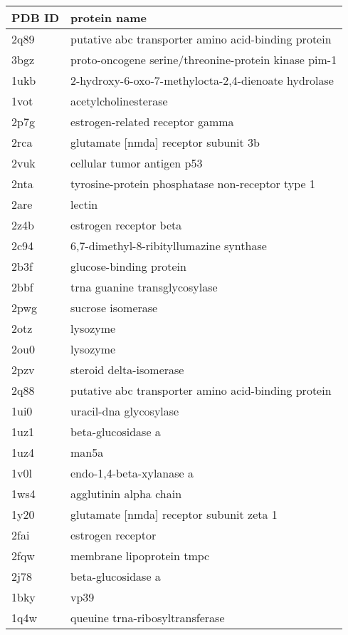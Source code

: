 \begin{tabular}{|l|l|}
\hline
\textbf{PDB ID} & \textbf{protein name} \\
\hline
\hline
2q89 & putative abc transporter amino acid-binding protein \\
\hline
3bgz & proto-oncogene serine/threonine-protein kinase pim-1 \\
\hline
1ukb & 2-hydroxy-6-oxo-7-methylocta-2,4-dienoate hydrolase \\
\hline
1vot & acetylcholinesterase \\
\hline
2p7g & estrogen-related receptor gamma \\
\hline
2rca & glutamate [nmda] receptor subunit 3b \\
\hline
2vuk & cellular tumor antigen p53 \\
\hline
2nta & tyrosine-protein phosphatase non-receptor type 1 \\
\hline
2are & lectin \\
\hline
2z4b & estrogen receptor beta \\
\hline
2c94 & 6,7-dimethyl-8-ribityllumazine synthase \\
\hline
2b3f & glucose-binding protein \\
\hline
2bbf & trna guanine transglycosylase \\
\hline
2pwg & sucrose isomerase \\
\hline
2otz & lysozyme \\
\hline
2ou0 & lysozyme \\
\hline
2pzv & steroid delta-isomerase \\
\hline
2q88 & putative abc transporter amino acid-binding protein \\
\hline
1ui0 & uracil-dna glycosylase \\
\hline
1uz1 & beta-glucosidase a \\
\hline
1uz4 & man5a \\
\hline
1v0l & endo-1,4-beta-xylanase a \\
\hline
1ws4 & agglutinin alpha chain \\
\hline
1y20 & glutamate [nmda] receptor subunit zeta 1 \\
\hline
2fai & estrogen receptor \\
\hline
2fqw & membrane lipoprotein tmpc \\
\hline
2j78 & beta-glucosidase a \\
\hline
1bky & vp39 \\
\hline
1q4w & queuine trna-ribosyltransferase \\

\end{tabular}
